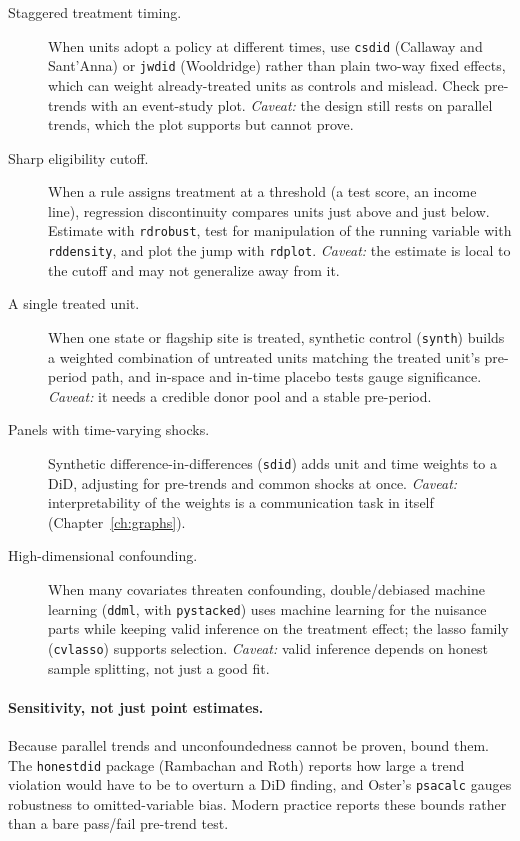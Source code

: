 \documentclass[
    a4paper,
    fontsize=10pt,
    twoside=true,
    numbers=noenddot,
]{kaobook}
\begin{document}
\begin{description}
    \item[Staggered treatment timing.] When units adopt a policy at different times, use \texttt{csdid} (Callaway and Sant'Anna) or \texttt{jwdid} (Wooldridge) rather than plain two-way fixed effects, which can weight already-treated units as controls and mislead. Check pre-trends with an event-study plot. \emph{Caveat:} the design still rests on parallel trends, which the plot supports but cannot prove.
    \item[Sharp eligibility cutoff.] When a rule assigns treatment at a threshold (a test score, an income line), regression discontinuity compares units just above and just below. Estimate with \texttt{rdrobust}, test for manipulation of the running variable with \texttt{rddensity}, and plot the jump with \texttt{rdplot}. \emph{Caveat:} the estimate is local to the cutoff and may not generalize away from it.
    \item[A single treated unit.] When one state or flagship site is treated, synthetic control (\texttt{synth}) builds a weighted combination of untreated units matching the treated unit's pre-period path, and in-space and in-time placebo tests gauge significance. \emph{Caveat:} it needs a credible donor pool and a stable pre-period.
    \item[Panels with time-varying shocks.] Synthetic difference-in-differences (\texttt{sdid}) adds unit and time weights to a DiD, adjusting for pre-trends and common shocks at once. \emph{Caveat:} interpretability of the weights is a communication task in itself (Chapter~\ref{ch:graphs}).
    \item[High-dimensional confounding.] When many covariates threaten confounding, double/debiased machine learning (\texttt{ddml}, with \texttt{pystacked}) uses machine learning for the nuisance parts while keeping valid inference on the treatment effect; the lasso family (\texttt{cvlasso}) supports selection. \emph{Caveat:} valid inference depends on honest sample splitting, not just a good fit.
\end{description}

\paragraph{Sensitivity, not just point estimates.} Because parallel trends and unconfoundedness cannot be proven, bound them. The \texttt{honestdid} package (Rambachan and Roth) reports how large a trend violation would have to be to overturn a DiD finding, and Oster's \texttt{psacalc} gauges robustness to omitted-variable bias. Modern practice reports these bounds rather than a bare pass/fail pre-trend test.
\end{document}
